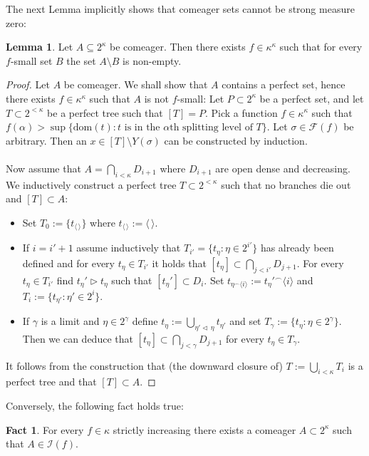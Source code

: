 \documentclass[12pt,a4paper]{scrartcl}
\theoremstyle{definition}
\newtheorem{fact}[definition]{Fact}
\newtheorem{lemma}[definition]{Lemma}
\numberwithin{equation}{section}
\begin{document}
The next Lemma implicitly shows that comeager sets cannot be strong measure zero:

\begin{lemma} \label{L1}
Let $A \subseteq 2^\kappa$ be comeager. Then there exists $f \in \kappa^\kappa$ such that for every $f$-small set $B$ the set $A\setminus  B $ is non-empty.
\end{lemma}

\begin{proof}
Let $A$ be comeager. We shall show that $A$ contains a perfect set, hence there exists $f \in \kappa^\kappa$ such that $A$ is not $f$-small: Let $P \subset 2^\kappa$ be a perfect set, and let $T \subset 2^{< \kappa}$ be a perfect tree such that $[T]=P$. Pick a function $f \in \kappa^\kappa$ such that $f(\alpha) > \sup \{ \text{dom}(t) \colon t \,\, \text{is in the}\,\, \alpha \text{th} \,\, \text{splitting level of} \,\,T\}$. Let $\sigma \in \mathcal{F}(f)$ be arbitrary. Then an $x \in [T] \setminus Y(\sigma)$ can be constructed by induction.\\
\\
Now assume that $A= \bigcap_{i<\kappa}D_{i+1}$ where $D_{i+1}$ are open dense and decreasing. We inductively construct a perfect tree $T \subset 2^{<\kappa}$ such that no branches die out and $[T] \subset A$:
\begin{itemize}
\item Set $T_0:=\{t_{\langle \, \rangle}\}$ where $t_{\langle \, \rangle}:= \langle \,\rangle$.
\item If $i=i'+1$ assume inductively that $T_{i'}=\{t_\eta \colon \eta \in 2^{i'}\}$ has already been defined and for every $t_\eta \in T_{i'}$ it holds that $[t_\eta] \subset \bigcap_{j < i'} D_{j+1}$. For every $t_\eta \in T_{i'}$ find $t_\eta' \triangleright t_\eta$ such that $[t_\eta'] \subset D_i$. Set $t_{\eta^\frown \langle i \rangle}:=t_\eta'^\frown \langle i \rangle$ and $T_i:=\{t_{\eta'} \colon \eta' \in 2^i\}$.
\item If $\gamma$ is a limit and $\eta \in 2^\gamma$ define $t_\eta:= \bigcup_{\eta' \triangleleft \, \eta} t_{\eta'}$ and set $T_\gamma:=\{t_\eta \colon \eta \in 2^\gamma\}$. Then we can deduce that $[t_\eta] \subset \bigcap_{j< \gamma} D_{j+1}$ for every $t_\eta \in T_\gamma$.
\end{itemize}
It follows from the construction that (the downward closure of) $T:= \bigcup_{i < \kappa} T_i$ is a perfect tree and that $[T] \subset A$.
\end{proof}

Conversely, the following fact holds true:
\begin{fact}
For every $f \in \kappa$ strictly increasing there exists a comeager $A \subset 2^\kappa$ such that $A \in \mathcal{I}(f)$.

\end{fact}
\end{document}
